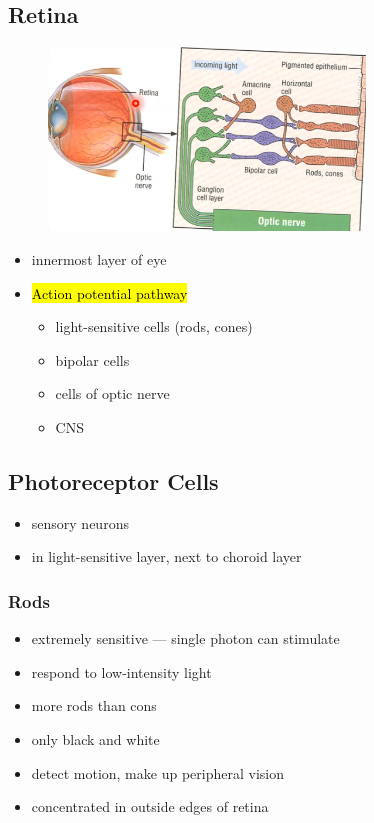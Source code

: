 \documentclass[a4paper,12pt]{article}
\begin{document}
\subsection{Retina}
\begin{figure}[H]
    \centering
    \includegraphics[width=0.75\textwidth]{retina}
\end{figure}
\begin{itemize}
    \item{innermost layer of eye}
    \item{
            \hl{Action potential pathway}
            \begin{itemize}
                \item{light-sensitive cells (rods, cones)}
                \item{bipolar cells}
                \item{cells of optic nerve}
                \item{CNS}
            \end{itemize}
        }
\end{itemize}

\subsection{Photoreceptor Cells}
\begin{itemize}
    \item{sensory neurons}
    \item{in light-sensitive layer, next to choroid layer}
\end{itemize}

\subsubsection{Rods}
\begin{itemize}
    \item{extremely sensitive --- single photon can stimulate}
    \item{respond to low-intensity light}
    \item{more rods than cons}
    \item{only black and white}
    \item{detect motion, make up peripheral vision}
    \item{concentrated in outside edges of retina}
\end{itemize}
\end{document}
